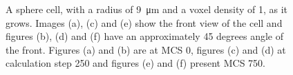 \begin{figure}[ht]
\begin{center}
{	}
	\end{center}
	\begin{center}
	\end{center}
	\caption[Growth of a sphere cell with a radius of 9]{\label{img:GrowthSphereCellRadius9}A sphere cell, with a radius of \SI{9}{\micro\metre} and a voxel density of 1, as it grows. Images (a), (c) and (e) show the front view of the cell and figures (b), (d) and (f) have an approximately 45 degrees angle of the front. Figures (a) and (b) are at \ac{MCS} 0, figures (c) and (d) at calculation step 250 and figures (e) and (f) present \ac{MCS} 750.}
\end{figure}


